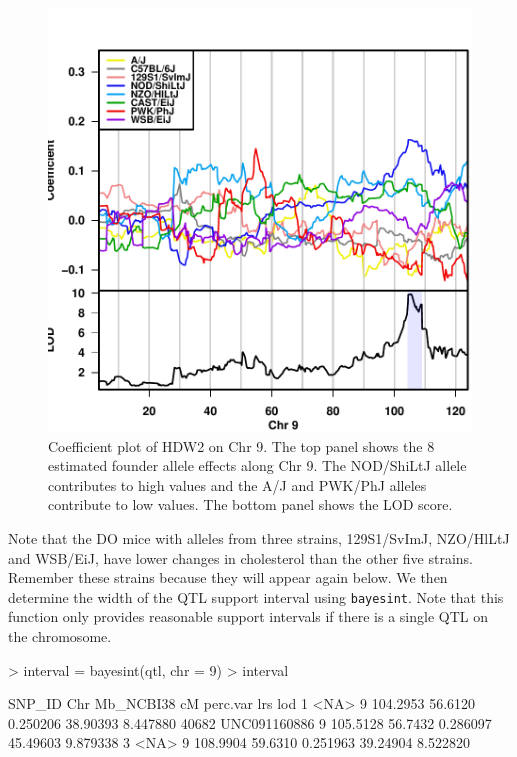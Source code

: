 \documentclass{article}
\begin{document}
\begin{figure}
\begin{center}
\includegraphics{QTL_Mapping_DO_Mice-fig2}
\end{center}
\caption{Coefficient plot of HDW2 on Chr 9. The top panel shows the 8 estimated founder allele effects along Chr 9. The NOD/ShiLtJ allele contributes to high values and the A/J and PWK/PhJ alleles contribute to low values. The bottom panel shows the LOD score.}
\label{fig:qtlplot}
\end{figure}

Note that the DO mice with alleles from three strains, 129S1/SvImJ, NZO/HlLtJ and WSB/EiJ,
have lower changes in cholesterol than the other five strains. Remember
these strains because they will appear again below.
\vspace{5 mm}  
We then determine the width of the QTL support interval using \texttt{bayesint}. Note that this function only provides reasonable support intervals if there is a single QTL on the chromosome.

\begin{Schunk}
\begin{Sinput}
> interval = bayesint(qtl, chr = 9)
> interval
\end{Sinput}
\begin{Soutput}
            SNP_ID Chr Mb_NCBI38      cM perc.var      lrs      lod
1             <NA>   9  104.2953 56.6120 0.250206 38.90393 8.447880
40682 UNC091160886   9  105.5128 56.7432 0.286097 45.49603 9.879338
3             <NA>   9  108.9904 59.6310 0.251963 39.24904 8.522820
\end{Soutput}
\end{Schunk}
\end{document}
